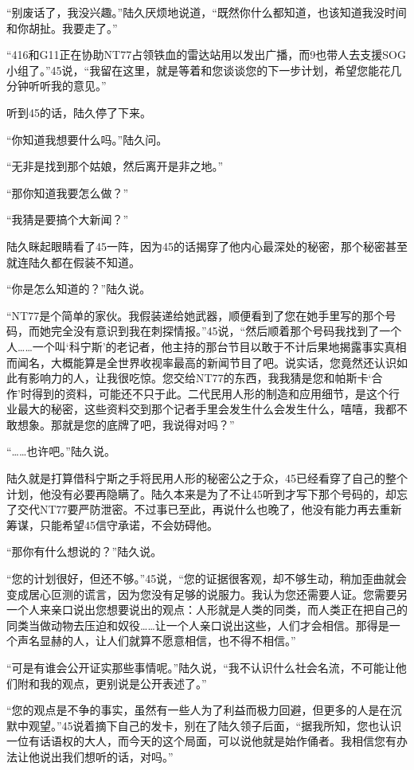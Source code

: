 “别废话了，我没兴趣。”陆久厌烦地说道，“既然你什么都知道，也该知道我没时间和你胡扯。我要走了。”

“416和G11正在协助NT77占领铁血的雷达站用以发出广播，而9也带人去支援SOG小组了。”45说，“我留在这里，就是等着和您谈谈您的下一步计划，希望您能花几分钟听听我的意见。”

听到45的话，陆久停了下来。

“你知道我想要什么吗。”陆久问。

“无非是找到那个姑娘，然后离开是非之地。”

“那你知道我要怎么做？”

“我猜是要搞个大新闻？”

陆久眯起眼睛看了45一阵，因为45的话揭穿了他内心最深处的秘密，那个秘密甚至就连陆久都在假装不知道。

“你是怎么知道的？”陆久说。

“NT77是个简单的家伙。我假装递给她武器，顺便看到了您在她手里写的那个号码，而她完全没有意识到我在刺探情报。”45说，“然后顺着那个号码我找到了一个人……一个叫‘科宁斯’的老记者，他主持的那台节目以敢于不计后果地揭露事实真相而闻名，大概能算是全世界收视率最高的新闻节目了吧。说实话，您竟然还认识如此有影响力的人，让我很吃惊。您交给NT77的东西，我我猜是您和帕斯卡‘合作’时得到的资料，可能还不只于此。二代民用人形的制造和应用细节，是这个行业最大的秘密，这些资料交到那个记者手里会发生什么会发生什么，嘻嘻，我都不敢想象。那就是您的底牌了吧，我说得对吗？”

“……也许吧。”陆久说。

陆久就是打算借科宁斯之手将民用人形的秘密公之于众，45已经看穿了自己的整个计划，他没有必要再隐瞒了。陆久本来是为了不让45听到才写下那个号码的，却忘了交代NT77要严防泄密。不过事已至此，再说什么也晚了，他没有能力再去重新筹谋，只能希望45信守承诺，不会妨碍他。

“那你有什么想说的？”陆久说。

“您的计划很好，但还不够。”45说，“您的证据很客观，却不够生动，稍加歪曲就会变成居心叵测的谎言，因为您没有足够的说服力。我认为您还需要人证。您需要另一个人来亲口说出您想要说出的观点：人形就是人类的同类，而人类正在把自己的同类当做动物去压迫和奴役……让一个人亲口说出这些，人们才会相信。那得是一个声名显赫的人，让人们就算不愿意相信，也不得不相信。”

“可是有谁会公开证实那些事情呢。”陆久说，“我不认识什么社会名流，不可能让他们附和我的观点，更别说是公开表述了。”

“您的观点是不争的事实，虽然有一些人为了利益而极力回避，但更多的人是在沉默中观望。”45说着摘下自己的发卡，别在了陆久领子后面，“据我所知，您也认识一位有话语权的大人，而今天的这个局面，可以说他就是始作俑者。我相信您有办法让他说出我们想听的话，对吗。”

